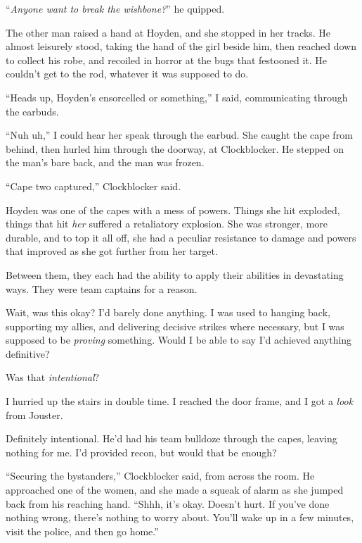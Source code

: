 ``\emph{Anyone want to break the wishbone?}'' he quipped.



The other man raised a hand at Hoyden, and she stopped in her tracks.  He almost leisurely stood, taking the hand of the girl beside him, then reached down to collect his robe, and recoiled in horror at the bugs that festooned it.  He couldn't get to the rod, whatever it was supposed to do.



``Heads up, Hoyden's ensorcelled or something,'' I said, communicating through the earbuds.



``Nuh uh,'' I could hear her speak through the earbud.  She caught the cape from behind, then hurled him through the doorway, at Clockblocker.  He stepped on the man's bare back, and the man was frozen.



``Cape two captured,'' Clockblocker said.



Hoyden was one of the capes with a mess of powers.  Things she hit exploded, things that hit \emph{her} suffered a retaliatory explosion.  She was stronger, more durable, and to top it all off, she had a peculiar resistance to damage and powers that improved as she got further from her target.



Between them, they each had the ability to apply their abilities in devastating ways.  They were team captains for a reason.



Wait, was this okay?  I'd barely done anything.  I was used to hanging back, supporting my allies, and delivering decisive strikes where necessary, but I was supposed to be \emph{proving} something.  Would I be able to say I'd achieved anything definitive?



Was that \emph{intentional}?



I hurried up the stairs in double time.  I reached the door frame, and I got a \emph{look} from Jouster.



Definitely intentional.  He'd had his team bulldoze through the capes, leaving nothing for me.  I'd provided recon, but would that be enough?



``Securing the bystanders,'' Clockblocker said, from across the room.  He approached one of the women, and she made a squeak of alarm as she jumped back from his reaching hand.  ``Shhh, it's okay.  Doesn't hurt.  If you've done nothing wrong, there's nothing to worry about.  You'll wake up in a few minutes, visit the police, and then go home.''



